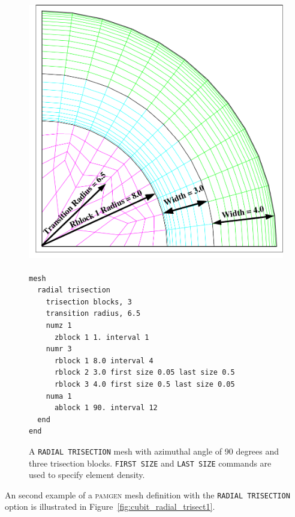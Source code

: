 \begin{figure}[!thbp]
\centering
  \hfil
  \begin{minipage}[c]{1.0\linewidth}
    \centering
      \includegraphics[width=5.5in,height=4.5in]{cubit_tris_rad_grad_trans}
{\ttfamily \begin{verbatim}
mesh
  radial trisection
    trisection blocks, 3
    transition radius, 6.5
    numz 1
      zblock 1 1. interval 1
    numr 3
      rblock 1 8.0 interval 4
      rblock 2 3.0 first size 0.05 last size 0.5
      rblock 3 4.0 first size 0.5 last size 0.05
    numa 1
      ablock 1 90. interval 12
  end
end
\end{verbatim}}
  \end{minipage}
  \caption [A \texttt{RADIAL TRISECTION} mesh with three trisection blocks.]{A \texttt{RADIAL TRISECTION} mesh with azimuthal
    angle of 90 degrees and three trisection blocks. \texttt{FIRST
      SIZE} and \texttt{LAST SIZE} commands are used to specify
    element density.}
  \label{fig:cubit_radial_trisect3}
\end{figure}

An second example of a \textsc{pamgen} mesh definition with the
\texttt{RADIAL TRISECTION} option is illustrated in
Figure~\ref{fig:cubit_radial_trisect1}. 

